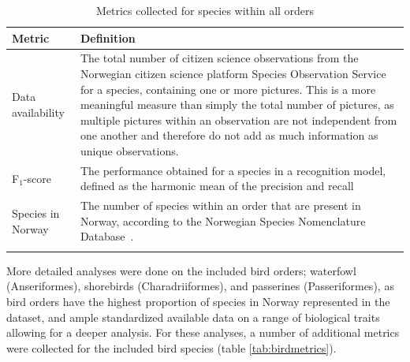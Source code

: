 \documentclass{article}
\begin{document}
\begin{longtable}{|p{} | p{} |}
  \hline
  \textbf{Metric}   & \textbf{Definition}                                                                                                                                                                                                                                                                                                                                                                                  \\ [0.5ex]
  \hline
  Data availability &
  The total number of citizen science observations from the Norwegian citizen science platform Species Observation Service~\cite{artsobs} for a species, containing one or more pictures. This is a more meaningful measure than simply the total number of pictures, as multiple pictures within an observation are not independent from one another and therefore do not add as much information as unique observations. \\
  \hline
  F$_1$-score       & The performance obtained for a species in a recognition model, defined as the harmonic mean of the precision and recall~\cite{Goodfellow}                                                                                                                                                                                                                                                            \\
  \hline
  Species in Norway & The number of species within an order that are present in Norway, according to the Norwegian Species Nomenclature Database~\cite{NBIC}.                                                                                                                                                                                                                                                              \\[1ex]
  \hline
  \caption{\footnotesize Metrics collected for species within all orders}
  \label{tab:allmetrics}
\end{longtable}

More detailed analyses were done on the included bird orders; waterfowl (Anseriformes), shorebirds (Charadriiformes), and passerines (Passeriformes), as bird orders have the highest proportion of species in Norway represented in the dataset, and ample standardized available data on a range of biological traits allowing for a deeper analysis. For these analyses, a number of additional metrics were collected for the included bird species (table \ref{tab:birdmetrics}).
\end{document}
